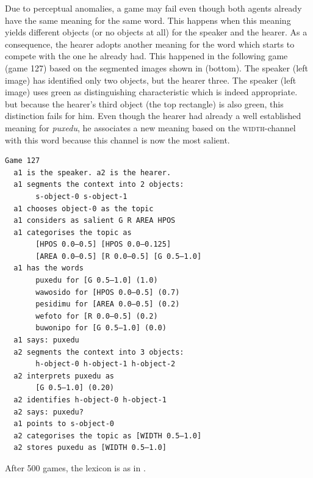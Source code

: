 Due to perceptual anomalies, a game may fail even though 
both agents already have the same meaning for the 
same word. This happens when this meaning yields different 
objects (or no objects at all) for the speaker and the hearer. 
As a consequence, the hearer adopts another meaning for 
the word which starts to compete with the one he already had. 
This happened in the following game (game 127)
based on the segmented images shown in  (bottom). The speaker (left image) has identified
only two objects, but the hearer three. The 
speaker (left image) uses green as distinguishing 
characteristic which is indeed appropriate. but 
because the hearer's third object (the top rectangle) is 
also green, this distinction fails for him.  
Even though the hearer had already a well established
meaning for \textit{puxedu}, he associates a new meaning 
based on the \textsc{width}-channel with this word because this 
channel is now the most salient. 
\begin{verbatim}
Game 127
  a1 is the speaker. a2 is the hearer. 
  a1 segments the context into 2 objects: 
       s-object-0 s-object-1
  a1 chooses object-0 as the topic 
  a1 considers as salient G R AREA HPOS 
  a1 categorises the topic as 
       [HPOS 0.0–0.5] [HPOS 0.0–0.125]
       [AREA 0.0–0.5] [R 0.0–0.5] [G 0.5–1.0]
  a1 has the words
       puxedu for [G 0.5–1.0] (1.0)
       wawosido for [HPOS 0.0–0.5] (0.7)
       pesidimu for [AREA 0.0–0.5] (0.2)
       wefoto for [R 0.0–0.5] (0.2)
       buwonipo for [G 0.5–1.0] (0.0)
  a1 says: puxedu
  a2 segments the context into 3 objects: 
       h-object-0 h-object-1 h-object-2
  a2 interprets puxedu as
       [G 0.5–1.0] (0.20)
  a2 identifies h-object-0 h-object-1
  a2 says: puxedu?
  a1 points to s-object-0
  a2 categorises the topic as [WIDTH 0.5–1.0]
  a2 stores puxedu as [WIDTH 0.5–1.0]
\end{verbatim}

After 500 games, the lexicon is as in . 

